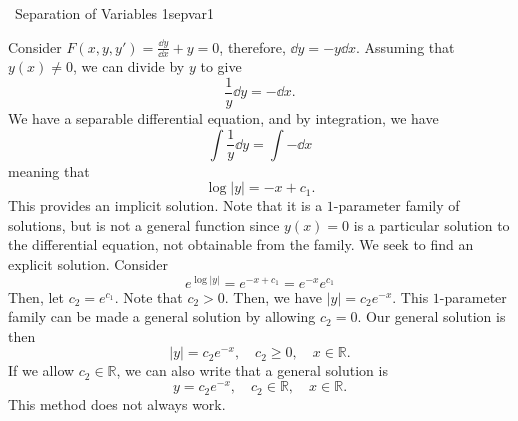     \begin{example}{\Difficulty\,\Difficulty\,\,Separation of Variables 1}{sepvar1}

        Consider \(F(x,y,y')=\frac{\dd y}{\dd x}+y=0\), therefore, \(\dd y=-y\dd x\). Assuming that \(y(x)\neq0\), we can divide by \(y\) to give
        \begin{equation*}
            \frac{1}{y}\dd y=-\dd x.
        \end{equation*} 
        We have a separable differential equation, and by integration, we have
        \begin{equation*}
            \int \frac{1}{y}\dd y=\int -\dd x
        \end{equation*}
        meaning that
        \begin{equation*}
            \log|y|=-x+c_1.
        \end{equation*}
        This provides an implicit solution. Note that it is a \(1\)-parameter family of solutions, but is not a general function since \(y(x)=0\) is a particular solution to the differential equation, not obtainable from the family. We seek to find an explicit solution. Consider
        \begin{equation*}
            e^{\log|y|}=e^{-x+c_1}=e^{-x}e^{c_1}
        \end{equation*}
        Then, let \(c_2=e^{c_1}\). Note that \(c_2>0\). Then, we have \(|y|=c_2e^{-x}\). This \(1\)-parameter family can be made a general solution by allowing \(c_2=0\). Our general solution is then
        \begin{equation*}
            |y|=c_2e^{-x},\quad c_2\geq0, \quad x\in\mathbb{R}.
        \end{equation*}
        If we allow \(c_2\in\mathbb{R}\), we can also write that a general solution is
        \begin{equation*}
            y=c_2e^{-x},\quad c_2\in\mathbb{R},\quad x\in\mathbb{R}.
        \end{equation*}
        This method does not always work.
        
    \end{example}
    \pagebreak
